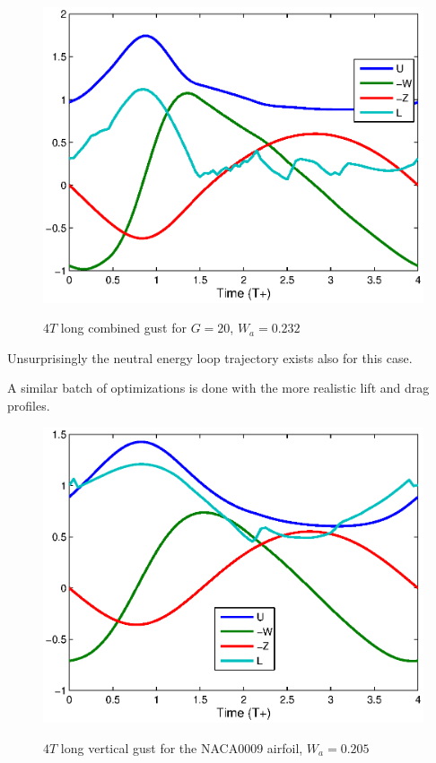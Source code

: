 \begin{figure}[h]
  \begin{center}
    \scalebox{1.0}
    {\includegraphics{./Figures/Windtype=3_Tg=4_Wg=0p232_quad_G=20.eps}}
  \end{center}
  \caption{$4T$ long combined gust for $G=20$, $W_a=0.232$}
  \label{fig:combined_optimization}
\end{figure}

Unsurprisingly the neutral energy loop trajectory exists also for this case.

\FloatBarrier


\par A similar batch of optimizations is done with the more realistic lift and drag profiles.

\begin{figure}
  \begin{center}
   \scalebox{1.0}
   {\includegraphics{./Figures/Windtype=1_Tg=4_Wg=0p205_UAV_alphamax=12.eps}}
  \end{center}
  \caption{$4T$ long vertical gust for the NACA0009 airfoil, $W_a=0.205$}
  \label{fig:vertical_optimization_UAV}
\end{figure}


